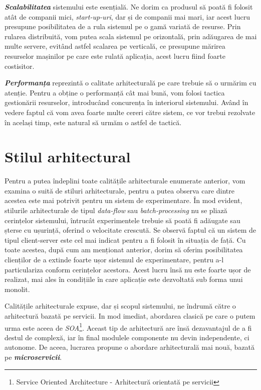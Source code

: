 \textbf{\textit{Scalabilitatea}} sistemului este esențială. Ne dorim ca produsul să poată fi folosit atât de companii mici, \textit{start-up-uri}, dar și de companii mai mari, iar acest lucru presupune posibilitatea de a rula sistemul pe o gamă variată de resurse. Prin rularea distribuită, vom putea scala sistemul pe orizontală, prin adăugarea de mai multe servere, evitând astfel scalarea pe verticală, ce presupune mărirea resurselor mașinilor pe care este rulată aplicația, acest lucru fiind foarte costisitor.

\textbf{\textit{Performanța}} reprezintă o calitate arhitecturală pe care trebuie să o urmărim cu atenție. Pentru a obține o performanță cât mai bună, vom folosi tactica gestionării resurselor, introducând concurența în interiorul sistemului. Având în vedere faptul că vom avea foarte multe cereri către sistem, ce vor trebui rezolvate în același timp, este natural să urmăm o astfel de tactică.  


\section{Stilul arhitectural}

Pentru a putea îndeplini toate calitățile arhitecturale enumerate anterior, vom examina o suită de stiluri arhitecturale, pentru a putea observa care dintre acestea este mai potrivit pentru un sistem de experimentare. În mod evident, stilurile arhitecturale de tipul \textit{data-flow} sau \textit{batch-processing} nu se pliază cerințelor sistemului, întrucât experimentele trebuie să poată fi adăugate sau șterse cu ușurință, oferind o velocitate crescută. Se observă faptul că un sistem de tipul client-server este cel mai indicat pentru a fi folosit în situația de față. Cu toate acestea, după cum am menționat anterior, dorim să oferim posibilitatea clienților de a extinde foarte ușor sistemul de experimentare, pentru a-l particulariza conform cerințelor acestora. Acest lucru însă nu este foarte ușor de realizat, mai ales în condițiile în care aplicație este dezvoltată sub forma unui monolit.

Calitățile arhitecturale expuse, dar și scopul sistemului, ne îndrumă către o arhitectură bazată pe servicii. In mod imediat, abordarea clasică pe care o putem urma este aceea de \textit{SOA}\footnote{Service Oriented Architecture - Arhitectură orientată pe servicii}. Aceast tip de arhitectură are însă dezavantajul de a fi destul de complexă, iar în final modulele componente nu devin independente, ci autonome. De aceea, lucrarea propune o abordare arhitecturală mai nouă, bazată pe \textbf{\textit{microservicii}}.\cite{buildingmicro} 

